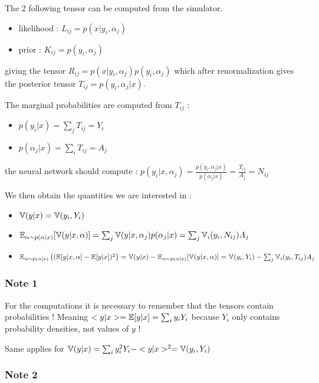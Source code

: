 The 2 following tensor can be computed from the simulator.
\begin{itemize}
  \item likelihood : $L_{ij} = p(x|y_i, \alpha_j)$
  \item prior : $K_{ij} = p(y_i, \alpha_j)$ 
\end{itemize}

giving the tensor $ R_{ij} = p(x|y_i, \alpha_j) p(y_i, \alpha_j) $ 
which after renormalization gives the posterior tensor $ T_{ij} = p(y_i, \alpha_j | x)$.

The marginal probabilities are computed from $T_{ij}$ :
\begin{itemize}
  \item $p(y_i | x) = \sum_j T_{ij} = Y_i$
  \item $p(\alpha_j | x) = \sum_i T_{ij} = A_j$
\end{itemize}

the neural network should compute : $p(y_i | x, \alpha_j) = \frac{p(y_i, \alpha_j | x)}{p(\alpha_j | x)} = \frac{T_{ij}}{A_j} = N_{ij}$

We then obtain the quantities we are interested in :
\begin{itemize}
  \item $ \mathbb{V}(y|x) = \mathbb{V}(y_i, Y_i) $
  \item $ \mathbb{E}_{\alpha \sim p(\alpha|x)}[ \mathbb{V}(y|x, \alpha) ] = \sum_j \mathbb{V}(y|x, \alpha_j) p(\alpha_j | x) = \sum_j \mathbb{V}_i(y_i, N_{ij}) A_j$
  \item $\mathbb{E}_{\alpha \sim p(\alpha|x)} \left ((\mathbb{E} [y|x, \alpha]  - \mathbb{E}[y|x])^2\right ) = \mathbb{V}(y|x) - \mathbb{E}_{\alpha \sim p(\alpha|x)}[ \mathbb{V}(y|x, \alpha) ] = \mathbb{V}(y_i, Y_i) - \sum_j \mathbb{V}_i(y_i, T_{ij}) A_j$
\end{itemize}


\subsubsection{Note 1}

For the computations it is necessary to remember that the tensors contain probabilities !
Meaning $<y|x>= \mathbb{E}[y|x] = \sum_i y_i Y_i$ because $Y_i$ only contains probability densities, not values of $y$ !

Same applies for $\mathbb{V}(y|x) = \sum_i y_i^2 Y_i - <y|x>^2 = \mathbb{V}(y_i, Y_i)$


\subsubsection{Note 2}

